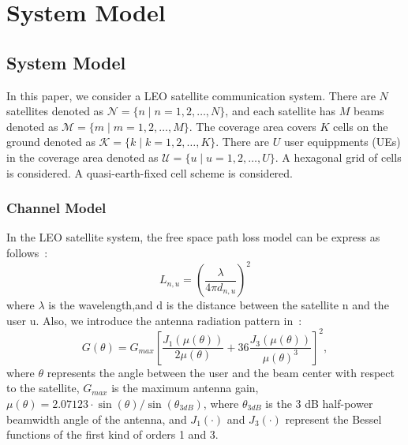 \chapter{System Model}
\label{chap:model}


\section{System Model}
In this paper, we consider a LEO satellite communication system. 
There are $N$ satellites denoted as $\mathcal{N} = \{n \mid n = 1, 2, \ldots, N\}$, and each satellite has $M$ beams denoted as $\mathcal{M} = \{m \mid m = 1, 2, \ldots, M\}$. 
The coverage area covers $K$ cells on the ground denoted as $\mathcal{K} = \{k \mid k = 1, 2, \ldots, K\}$.
There are $U$ user equippments (UEs) in the coverage area denoted as $\mathcal{U} = \{u \mid u = 1, 2, \ldots, U\}$. 
A hexagonal grid of cells is considered. A quasi-earth-fixed cell scheme is considered.

\subsection{Channel Model}
In the LEO satellite system, the free space path loss model can be express as follows~\cite{Satellite-Multi-Beam}:
\begin{equation}
    L_{n,u} = \left(\frac{\lambda}{4\pi d_{n,u}}\right)^2
\end{equation}
where $\lambda$ is the wavelength,and d is the distance between the satellite n and the user u.
Also, we introduce the antenna radiation pattern in~\cite{Energy-Efficient}:
\begin{equation}
G(\theta) = G_{max} \left[ \frac{J_1\left(\mu(\theta)\right)}{2\mu(\theta)} 
+ 36 \frac{J_3\left(\mu(\theta)\right)}{\mu(\theta)^3} \right]^2,
\end{equation}
where $\theta$ represents the angle between the user and the beam center with respect to the satellite, $G_{max}$ is the maximum antenna gain, $\mu(\theta) = 2.07123\cdot \sin(\theta)/\sin(\theta_{3dB})$, 
where $\theta_{3dB}$ is the 3 dB half-power beamwidth angle of the antenna, and $J_1(\cdot)$ and $J_3(\cdot)$ represent the Bessel functions of the first kind of orders 1 and 3.

